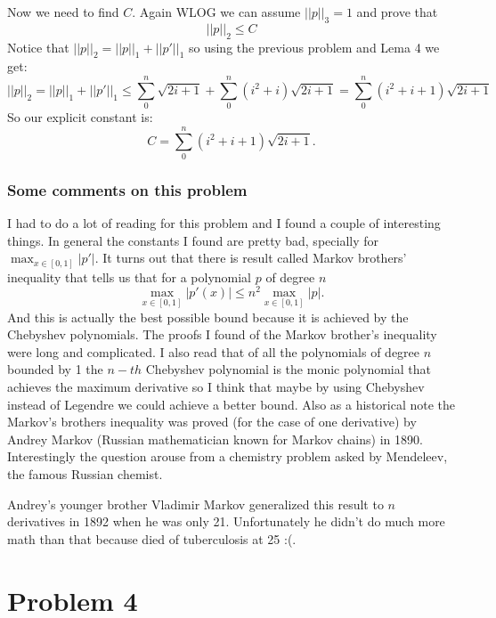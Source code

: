 \documentclass{article}
\begin{document}
Now we need to find $C$. Again WLOG we can assume $||p||_3=1$ and prove that
\[
	||p||_2\leq C
\]
Notice that $||p||_2=||p||_1+ ||p'||_1$ so using the previous problem and Lema 4 we get:
\[
	||p||_2=||p||_1+||p'||_1 \leq \sum_0^n \sqrt{2i+1} + \sum_0^n (i^2+i)\sqrt{2i+1} = \sum_0^n (i^2+i+1)\sqrt{2i+1}
\]
So our explicit constant is:
\[
	C=\sum_0^n (i^2+i+1)\sqrt{2i+1}.
\]
\subsubsection*{Some comments on this problem}
I had to do a lot of reading for this problem and I found a
couple of interesting things. In general the constants I found are pretty bad,
specially for $\max_{x\in[0,1]}|p'|$. It turns out that there is result called
Markov brothers' inequality that tells us that for a polynomial $p$ of degree
$n$
\[
\max_{x\in[0,1]}|p'(x)|\leq n^2 \max_{x\in[0,1]}|p|.
\]
And this is actually the best possible bound because it is achieved by the
Chebyshev polynomials. The proofs I found of the Markov brother's inequality
were long and complicated. I also read that of all the polynomials of degree
$n$ bounded by 1 the $n-th$ Chebyshev polynomial is the monic polynomial that
achieves the maximum derivative so I think that maybe by using Chebyshev
instead of Legendre we could achieve a better bound. Also as a historical note
the Markov's brothers inequality was proved (for the case of one derivative) by
Andrey Markov (Russian mathematician known for Markov chains) in 1890.
Interestingly the question arouse from a chemistry problem asked by Mendeleev,
the famous Russian chemist.

Andrey's younger brother Vladimir Markov generalized this result to $n$
derivatives in 1892 when he was only 21. Unfortunately he didn't do much more
math than that because died of tuberculosis at 25 :(.
\section*{Problem 4}
\end{document}
